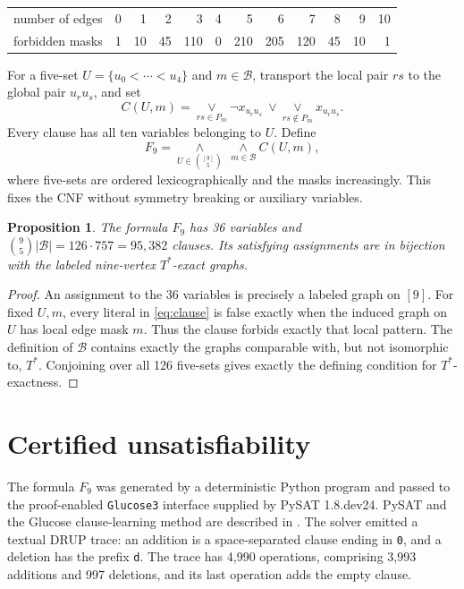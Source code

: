 \documentclass[11pt]{article}
\newtheorem{proposition}[theorem]{Proposition}
\theoremstyle{definition}
\newcommand{\Tstar}{T^{*}}
\begin{document}
\begin{center}
\begin{tabular}{c@{\quad}rrrrrrrrrrr}
\toprule
number of edges & 0&1&2&3&4&5&6&7&8&9&10\\
forbidden masks & 1&10&45&110&0&210&205&120&45&10&1\\
\bottomrule
\end{tabular}
\end{center}

For a five-set \(U=\{u_0<\cdots<u_4\}\) and \(m\in\mathcal B\), transport
the local pair \(rs\) to the global pair \(u_ru_s\), and set
\[
 C(U,m)=
 \mathop{\vee}\limits_{rs\in P_m}\lnot x_{u_ru_s}
 \ \vee\!
 \mathop{\vee}\limits_{rs\notin P_m}x_{u_ru_s}.
 \tag{1}\label{eq:clause}
\]
Every clause has all ten variables belonging to \(U\).  Define
\[
 F_9=\mathop{\wedge}\limits_{U\in\binom{[9]}5}\ \mathop{\wedge}\limits_{m\in\mathcal B} C(U,m),
 \tag{2}\label{eq:cnf}
\]
where five-sets are ordered lexicographically and the masks increasingly.
This fixes the CNF without symmetry breaking or auxiliary variables.

\begin{proposition}\label{prop:equivalence}
The formula \(F_9\) has 36 variables and
\(\binom95\lvert\mathcal B\rvert=126\cdot757=95{,}382\) clauses.  Its
satisfying assignments are in bijection with the labeled nine-vertex
\(\Tstar\)-exact graphs.
\end{proposition}

\begin{proof}
An assignment to the 36 variables is precisely a labeled graph on \([9]\).
For fixed \(U,m\), every literal in \eqref{eq:clause} is false exactly when
the induced graph on \(U\) has local edge mask \(m\).  Thus the clause
forbids exactly that local pattern.  The definition of \(\mathcal B\)
contains exactly the graphs comparable with, but not isomorphic to,
\(\Tstar\).  Conjoining over all 126 five-sets gives exactly the defining
condition for \(\Tstar\)-exactness.
\end{proof}

\section{Certified unsatisfiability}

The formula \(F_9\) was generated by a deterministic Python program and
passed to the proof-enabled \texttt{Glucose3} interface supplied by PySAT
1.8.dev24.  PySAT and the Glucose clause-learning method are described in
\cite{IgnatievMorgadoMarquesSilva2018,AudemardSimon2009}.  The solver emitted
a textual DRUP trace: an addition is a space-separated clause ending in
\texttt{0}, and a deletion has the prefix \texttt{d}.  The trace has 4,990
operations, comprising 3,993 additions and 997 deletions, and its last
operation adds the empty clause.
\end{document}
